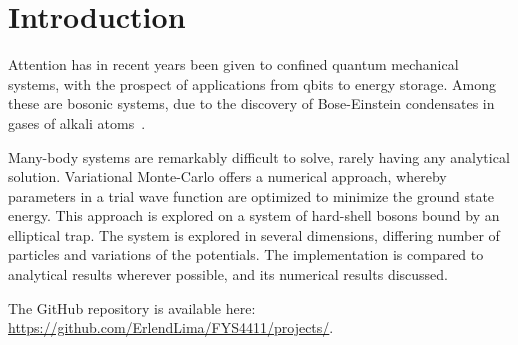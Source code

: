 \section{Introduction}

Attention has in recent years been given to confined quantum mechanical systems,
with the prospect of applications from qbits to energy storage. Among these
are bosonic systems, due to the discovery of Bose-Einstein condensates in gases
of alkali atoms~\cite{Nilsen2005}.\newline

Many-body systems are remarkably difficult to solve, rarely having any
analytical solution. Variational Monte-Carlo offers a numerical approach,
whereby parameters in a trial wave function are optimized to minimize the ground
state energy. This approach is explored on a system of hard-shell bosons bound by an
elliptical trap. The system is explored in several dimensions, differing number
of particles and variations of the potentials. The implementation is compared
to analytical results wherever possible, and its numerical results discussed.
\newline

The GitHub repository is available here: \url{https://github.com/ErlendLima/FYS4411/projects/}.

